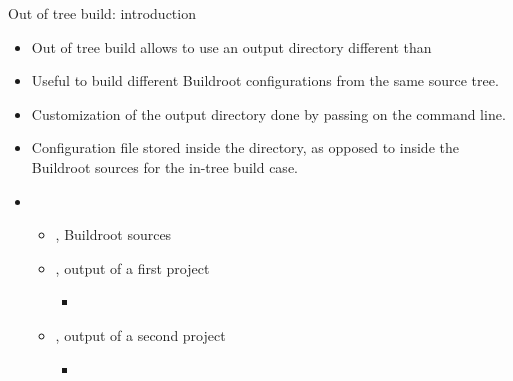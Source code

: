 \begin{frame}{Out of tree build: introduction}
  \begin{itemize}
  \item Out of tree build allows to use an output directory different
    than 
  \item Useful to build different Buildroot configurations from the
    same source tree.
  \item Customization of the output directory done by passing
     on the command line.
  \item Configuration file stored inside the  directory, as
    opposed to inside the Buildroot sources for the in-tree build
    case.
  \item {}
    \begin{itemize}
    \item {}, Buildroot sources
    \item {}, output of a first project
      \begin{itemize}
      \item {}
      \end{itemize}
    \item {}, output of a second project
      \begin{itemize}
      \item {}
      \end{itemize}
    \end{itemize}
  \end{itemize}
\end{frame}

